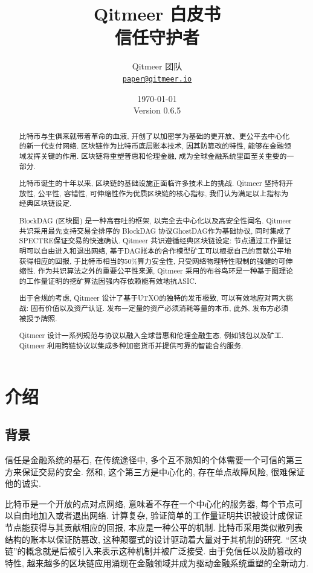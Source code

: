 \documentclass[a4paper,11pt]{article}
\title{\LARGE Qitmeer 白皮书\\
	\Large 信任守护者}
\author{
	Qitmeer 团队\\
		\small\href{mailto:paper@qitmeer.io}
			{\nolinkurl{paper@qitmeer.io}}
	}
\date{\today\\\small Version 0.6.5}
\newcommand{\watermark}[3]{\AddToShipoutPictureBG{
	\parbox[b][\paperheight]{\paperwidth}{
		\vfill%
		\centering%
	\tikz[remember picture, overlay]%
	  \node [rotate = #1, scale = #2] at (current page.center)%
	      {\textcolor{gray!80!cyan!30}{#3}};
	  \vfill}}}
\begin{document}
\clearpage
\pagestyle{plain}

\maketitle


\begin{abstract}
比特币\cite{bitcoin}与生俱来就带着革命的血液, 开创了以加密学为基础的更开放、更公平去中心化的新一代支付网络. 区块链作为比特币底层账本技术, 因其防篡改的特性, 能够在金融领域发挥关键的作用. 区块链将重塑普惠和伦理金融, 成为全球金融系统里面至关重要的一部分.

比特币诞生的十年以来, 区块链的基础设施正面临许多技术上的挑战. Qitmeer 坚持将开放性, 公平性, 容错性, 可伸缩性作为优质区块链的核心指标, 我们认为满足以上指标为经典区块链设定.

BlockDAG (区块图) 是一种高吞吐的框架, 以完全去中心化以及高安全性闻名. Qitmeer共识采用最先支持交易全排序的 BlockDAG 协议GhostDAG作为基础协议, 同时集成了SPECTRE保证交易的快速确认. Qitmeer 共识遵循经典区块链设定: 节点通过工作量证明可以自由进入和退出网络, 基于DAG账本的合作模型矿工可以根据自己的贡献公平地获得相应的回报, 于比特币相当的50\%算力安全性, 只受网络物理特性限制的强健的可伸缩性. 作为共识算法之外的重要公平性来源, Qitmeer 采用的布谷鸟环是一种基于图理论的工作量证明的挖矿算法因强内存依赖能有效地抗ASIC. 

出于合规的考虑, Qitmeer 设计了基于UTXO的独特的发币极致, 可以有效地应对两大挑战: 固有价值以及资产认证. 发布一定量的资产必须消耗等量的本币, 此外, 发布方必须被授予牌照.

Qitmeer 设计一系列规范与协议以融入全球普惠和伦理金融生态, 例如钱包以及矿工. Qitmeer 利用跨链协议以集成多种加密货币并提供可靠的智能合约服务.

\end{abstract}

\section{介绍}

\subsection{背景}

信任是金融系统的基石, 在传统途径中, 多个互不熟知的个体需要一个可信的第三方来保证交易的安全. 然和, 这个第三方是中心化的, 存在单点故障风险, 很难保证他的诚实.


比特币是一个开放的点对点网络, 意味着不存在一个中心化的服务器, 每个节点可以自由地加入或者退出网络. 计算复杂, 验证简单的工作量证明共识被设计成保证节点能获得与其贡献相应的回报, 本应是一种公平的机制. 比特币采用类似散列表结构的账本以保证防篡改, 这种颠覆式的设计驱动着大量对于其机制的研究. “区块链”的概念就是后被引入来表示这种机制并被广泛接受. 由于免信任以及防篡改的特性, 越来越多的区块链应用涌现在金融领域并成为驱动金融系统重塑的全新动力.
\end{document}
